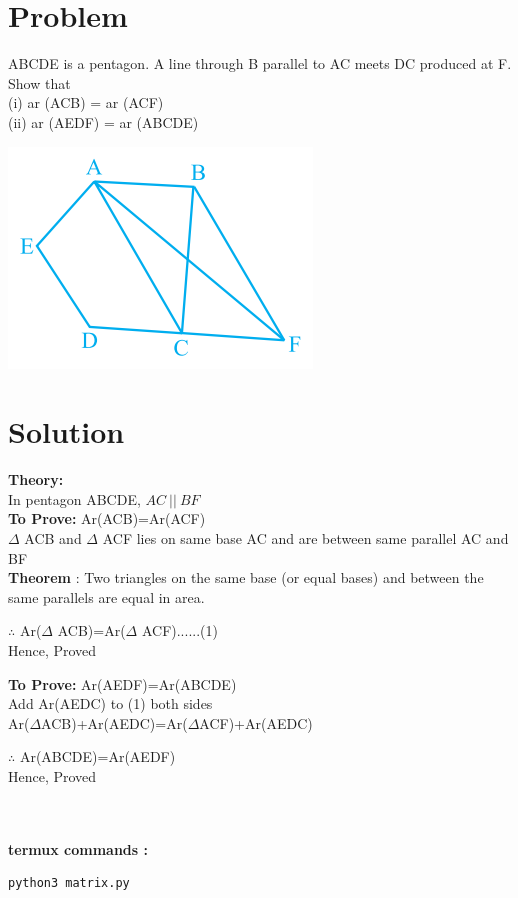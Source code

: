 \documentclass[10pt, a4paper]{article}
\title{\mytitle}
\author{\myauthor\hspace{1em}\\\contact\\FWC22034\hspace{6.5em}IITH\hspace{0.5em}\mymodule\hspace{6em}ASSIGN-5}
\date{}
\begin{document}
	\maketitle
	\tableofcontents
   \section{Problem}
   ABCDE is a pentagon. A line through
B parallel to AC meets DC produced at F. Show
that \\
(i) ar (ACB) = ar (ACF) \\       
(ii) ar (AEDF) = ar (ABCDE)

	    \includegraphics[scale=1.0]{diag_1.png}
   \section{Solution}
   \textbf{Theory:}\\
In pentagon ABCDE, $ AC\: || \: BF$ \\
\textbf{To Prove:} Ar(ACB)=Ar(ACF) \\
$\Delta$ ACB and $\Delta$ ACF lies on same base AC and are between same parallel AC and BF\\
\textbf{Theorem} : Two triangles on the same base (or equal bases) and between the same parallels are equal in area.
\begin{center}
$\therefore$ Ar($\Delta$ ACB)=Ar($\Delta$ ACF)......(1)\\
Hence, Proved    
\end{center}
\textbf{To Prove:}  Ar(AEDF)=Ar(ABCDE)\\
Add Ar(AEDC) to (1) both sides\\
Ar($\Delta$ACB)+Ar(AEDC)=Ar($\Delta$ACF)+Ar(AEDC)
\begin{center}
$\therefore$ Ar(ABCDE)=Ar(AEDF)     \\
Hence, Proved \\
\
\\
\
\\
\end{center}
\textbf{termux commands :}
\begin{lstlisting}
python3 matrix.py
\end{lstlisting}
\end{document}

